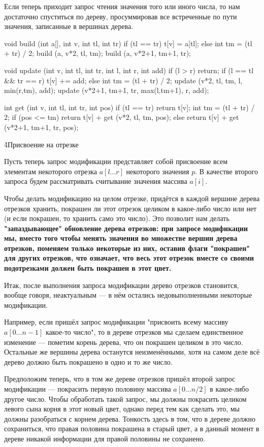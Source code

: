 Если теперь приходит запрос чтения значения того или иного числа, то нам достаточно спуститься по дереву, просуммировав все встреченные по пути значения, записанные в вершинах дерева.

\code
void build (int a[], int v, int tl, int tr) {
	if (tl == tr)
		t[v] = a[tl];
	else {
		int tm = (tl + tr) / 2;
		build (a, v*2, tl, tm);
		build (a, v*2+1, tm+1, tr);
	}
}

void update (int v, int tl, int tr, int l, int r, int add) {
	if (l > r)
		return;
	if (l == tl && tr == r)
		t[v] += add;
	else {
		int tm = (tl + tr) / 2;
		update (v*2, tl, tm, l, min(r,tm), add);
		update (v*2+1, tm+1, tr, max(l,tm+1), r, add);
	}
}

int get (int v, int tl, int tr, int pos) {
	if (tl == tr)
		return t[v];
	int tm = (tl + tr) / 2;
	if (pos <= tm)
		return t[v] + get (v*2, tl, tm, pos);
	else
		return t[v] + get (v*2+1, tm+1, tr, pos);
}
\endcode

\h4{Присвоение на отрезке}

Пусть теперь запрос модификации представляет собой присвоение всем элементам некоторого отрезка $a[l \ldots r]$ некоторого значения $p$. В качестве второго запроса будем рассматривать считывание значения массива $a[i]$.

Чтобы делать модификацию на целом отрезке, придётся в каждой вершине дерева отрезков хранить, покрашен ли этот отрезок целиком в какое-либо число или нет (и если покрашен, то хранить само это число). Это позволит нам делать \bf{"запаздывающее" обновление} дерева отрезков: при запросе модификации мы, вместо того чтобы менять значения во множестве вершин дерева отрезков, поменяем только некоторые из них, оставив флаги "покрашен" для других отрезков, что означает, что весь этот отрезок вместе со своими подотрезками должен быть покрашен в этот цвет.

Итак, после выполнения запроса модификации дерево отрезков становится, вообще говоря, неактуальным --- в нём остались недовыполненными некоторые модификации.

Например, если пришёл запрос модификации "присвоить всему массиву $a[0 \ldots n-1]$ какое-то число", то в дереве отрезков мы сделаем единственное изменение --- пометим корень дерева, что он покрашен целиком в это число. Остальные же вершины дерева останутся неизменёнными, хотя на самом деле всё дерево должно быть покрашено в одно и то же число.

Предположим теперь, что в том же дереве отрезков пришёл второй запрос модификации --- покрасить первую половину массива $a[0 \ldots n/2]$ в какое-либо другое число. Чтобы обработать такой запрос, мы должны покрасить целиком левого сына корня в этот новый цвет, однако перед тем как сделать это, мы должны разобраться с корнем дерева. Тонкость здесь в том, что в дереве должно сохраниться, что правая половина покрашена в старый цвет, а в данный момент в дереве никакой информации для правой половины не сохранено.

